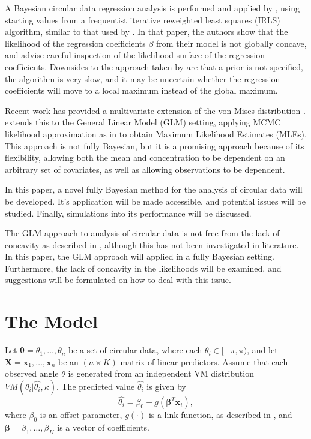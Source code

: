 \documentclass[12pt,a4paper]{article}
\begin{document}
A Bayesian circular data regression analysis is performed and applied by \citet{gill2010}, using starting values from a frequentist iterative reweighted least squares (IRLS) algorithm, similar to that used by \citet{fisher1992regression}. In that paper, the authors show that the likelihood of the regression coefficients $\beta$ from their model is not globally concave, and advise careful inspection of the likelihood surface of the regression coefficients. Downsides to the approach taken by \citet{gill2010} are that a prior is not specified, the algorithm is very slow, and it may be uncertain whether the regression coefficients will move to a local maximum instead of the global maximum. 

Recent work has provided a multivariate extension of the von Mises distribution \citep{mardia2008multivariate,mardia2014some}. \citet{lagona2014regression} extends this to the General Linear Model (GLM) setting, applying MCMC likelihood approximation as in \citet{geyer1992constrained} to obtain Maximum Likelihood Estimates (MLEs). This approach is not fully Bayesian, but it is a promising approach because of its flexibility, allowing both the mean and concentration to be dependent on an arbitrary set of covariates, as well as allowing observations to be dependent.

In this paper, a novel fully Bayesian method for the analysis of circular data will be developed. It's application will be made accessible, and potential issues will be studied. Finally, simulations into its performance will be discussed.

The GLM approach to analysis of circular data is not free from the lack of concavity as described in \citet{gill2010}, although this has not been investigated in literature. In this paper, the GLM approach will applied in a fully Bayesian setting. Furthermore, the lack of concavity in the likelihoods will be examined, and suggestions will be formulated on how to deal with this issue. 

\section{The Model}

Let $\boldsymbol\theta = \theta_1, \dots, \theta_n$ be a set of circular data, where each $\theta_i \in [-\pi, \pi)$, and let $\boldsymbol{X} = \boldsymbol{x}_1, \dots, \boldsymbol{x}_n$ be an $(n \times K)$ matrix of linear predictors. Assume that each observed angle $\theta$ is generated from an independent VM distribution $ VM(\theta_i \vert \hat{\theta_i}, \kappa)$. The predicted value $\hat{\theta_i}$ is given by
\begin{equation}
\hat{\theta_i} = \beta_0 + g(\boldsymbol\beta^T \boldsymbol{x}_i), 
\end{equation}
where $\beta_0$ is an offset parameter, $g(\cdot)$ is a link function, as described in \citet{fisher1992regression}, and $\boldsymbol{\beta} = \beta_1, \dots, \beta_K$ is a vector of coefficients. 
\end{document}
